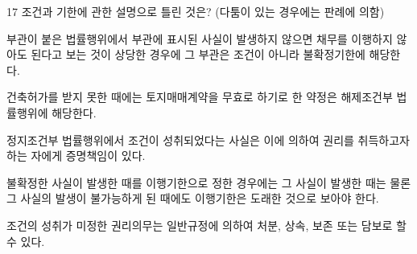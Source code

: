 \begin{question}{17}
조건과 기한에 관한 설명으로 틀린 것은? (다툼이 있는 경우에는 판례에 의함)
\begin{choices}
  \item 부관이 붙은 법률행위에서 부관에 표시된 사실이 발생하지 않으면 채무를 이행하지 않아도 된다고 보는 것이 상당한 경우에 그 부관은 조건이 아니라 불확정기한에 해당한다.
  \item 건축허가를 받지 못한 때에는 토지매매계약을 무효로 하기로 한 약정은 해제조건부 법률행위에 해당한다.
  \item 정지조건부 법률행위에서 조건이 성취되었다는 사실은 이에 의하여 권리를 취득하고자 하는 자에게 증명책임이 있다.
  \item 불확정한 사실이 발생한 때를 이행기한으로 정한 경우에는 그 사실이 발생한 때는 물론 그 사실의 발생이 불가능하게 된 때에도 이행기한은 도래한 것으로 보아야 한다.
  \item 조건의 성취가 미정한 권리의무는 일반규정에 의하여 처분, 상속, 보존 또는 담보로 할 수 있다.
\end{choices}
\end{question}
